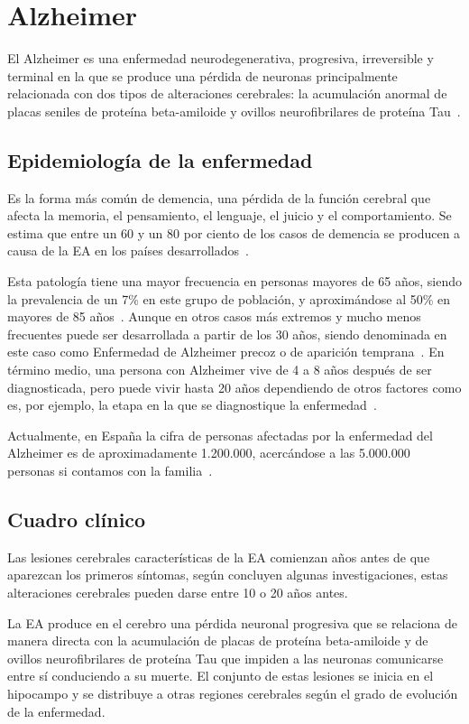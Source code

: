 \section{Alzheimer}\label{sec:alzheimer}
El Alzheimer es una enfermedad neurodegenerativa, progresiva, irreversible y terminal en la que se produce una pérdida
de neuronas principalmente relacionada con dos tipos de alteraciones cerebrales: la acumulación anormal de placas
seniles de proteína beta-amiloide y ovillos neurofibrilares de proteína Tau~\cite{ceafa}.

\subsection{Epidemiología de la enfermedad}\label{subsec:epidemiologia}
Es la forma más común de demencia, una pérdida de la función cerebral que afecta la memoria, el pensamiento, el
lenguaje, el juicio y el comportamiento.
Se estima que entre un 60 y un 80 por ciento de los casos de demencia se producen a causa de la EA en los países
desarrollados~\cite{alz-org-enfermedad}.

Esta patología tiene una mayor frecuencia en personas mayores de 65 años, siendo la prevalencia de un 7\% en este grupo
de población, y aproximándose al 50\% en mayores de 85 años~\cite{ceafa}.
Aunque en otros casos más extremos y mucho menos frecuentes puede ser desarrollada a partir de los 30 años, siendo
denominada en este caso como Enfermedad de Alzheimer precoz o de aparición temprana~\cite{mayo-clinic-alz-precoz}.
En término medio, una persona con Alzheimer vive de 4 a 8 años después de ser diagnosticada, pero puede vivir hasta 20
años dependiendo de otros factores como es, por ejemplo, la etapa en la que se diagnostique la enfermedad~\cite{alz-org-etapas}.

Actualmente, en España la cifra de personas afectadas por la enfermedad del Alzheimer es de aproximadamente 1.200.000,
acercándose a las 5.000.000 personas si contamos con la familia~\cite{ceafa}.

\subsection{Cuadro clínico}\label{subsec:cuadro-clinico}
Las lesiones cerebrales características de la EA comienzan años antes de que aparezcan los primeros síntomas, según
concluyen algunas investigaciones, estas alteraciones cerebrales pueden darse entre 10 o 20 años antes.

La EA produce en el cerebro una pérdida neuronal progresiva que se relaciona de manera directa con la acumulación de
placas de proteína beta-amiloide y de ovillos neurofibrilares de proteína Tau que impiden a las neuronas comunicarse
entre sí conduciendo a su muerte.
El conjunto de estas lesiones se inicia en el hipocampo y se distribuye a otras regiones cerebrales según el grado de
evolución de la enfermedad.

